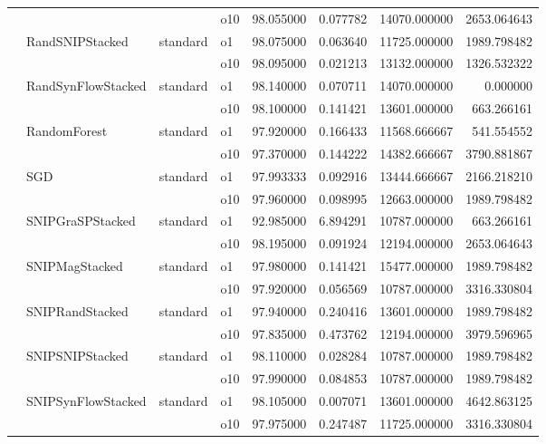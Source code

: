 \begin{longtable}{llllrrrr}
      &     &         & o10 &  98.055000 &   0.077782 &     14070.000000 &   2653.064643 \\
      & RandSNIPStacked & standard & o1 &  98.075000 &   0.063640 &     11725.000000 &   1989.798482 \\
      &     &         & o10 &  98.095000 &   0.021213 &     13132.000000 &   1326.532322 \\
      & RandSynFlowStacked & standard & o1 &  98.140000 &   0.070711 &     14070.000000 &      0.000000 \\
      &     &         & o10 &  98.100000 &   0.141421 &     13601.000000 &    663.266161 \\
      & RandomForest & standard & o1 &  97.920000 &   0.166433 &     11568.666667 &    541.554552 \\
      &     &         & o10 &  97.370000 &   0.144222 &     14382.666667 &   3790.881867 \\
      & SGD & standard & o1 &  97.993333 &   0.092916 &     13444.666667 &   2166.218210 \\
      &     &         & o10 &  97.960000 &   0.098995 &     12663.000000 &   1989.798482 \\
      & SNIPGraSPStacked & standard & o1 &  92.985000 &   6.894291 &     10787.000000 &    663.266161 \\
      &     &         & o10 &  98.195000 &   0.091924 &     12194.000000 &   2653.064643 \\
      & SNIPMagStacked & standard & o1 &  97.980000 &   0.141421 &     15477.000000 &   1989.798482 \\
      &     &         & o10 &  97.920000 &   0.056569 &     10787.000000 &   3316.330804 \\
      & SNIPRandStacked & standard & o1 &  97.940000 &   0.240416 &     13601.000000 &   1989.798482 \\
      &     &         & o10 &  97.835000 &   0.473762 &     12194.000000 &   3979.596965 \\
      & SNIPSNIPStacked & standard & o1 &  98.110000 &   0.028284 &     10787.000000 &   1989.798482 \\
      &     &         & o10 &  97.990000 &   0.084853 &     10787.000000 &   1989.798482 \\
      & SNIPSynFlowStacked & standard & o1 &  98.105000 &   0.007071 &     13601.000000 &   4642.863125 \\
      &     &         & o10 &  97.975000 &   0.247487 &     11725.000000 &   3316.330804 \\

\end{longtable}
